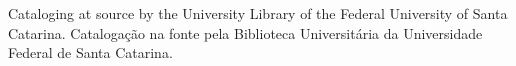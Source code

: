 \begin{fichacatalografica}
    \vspace*{\fill}

    \begin{center}

        \lang
        {Cataloging at source by the University Library of the Federal University of Santa Catarina.}
        {Catalogação na fonte pela Biblioteca Universitária da Universidade Federal de Santa Catarina.}


\end{center}
\end{fichacatalografica}
